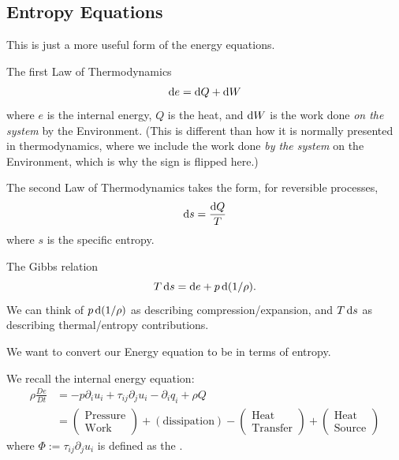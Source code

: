 \subsection{Entropy Equations}

\begin{node}
This is just a more useful form of the energy equations.
\end{node}

\begin{recall}
The first Law of Thermodynamics 
\begin{equation}
\mathrm{d} e = \mathrm{d} Q + \mathrm{d} W
\end{equation}
where $e$ is the internal energy, $Q$ is the heat, and $\mathrm{d} W$ is the
work done \emph{on the system} by the Environment. (This is different
than how it is normally presented in thermodynamics, where we include
the work done \emph{by the system} on the Environment, which is why
the sign is flipped here.)
\end{recall}

\begin{recall}
The second Law of Thermodynamics takes the form, for reversible processes,
\begin{equation}
\mathrm{d} s = \frac{\mathrm{d} Q}{T}
\end{equation}
where $s$ is the specific entropy.
\end{recall}

\begin{recall}
The Gibbs relation
\begin{equation}
T\,\mathrm{d} s = \mathrm{d} e + p\,\mathrm{d}(1/\rho).
\end{equation}
We can think of $p\,\mathrm{d}(1/\rho)$ as describing compression/expansion,
and $T\,\mathrm{d} s$ as describing thermal/entropy contributions.
\end{recall}

\begin{goal}
We want to convert our Energy equation to be in terms of entropy.
\end{goal}

\begin{node}
We recall the internal energy equation:
\begin{align}
\rho\frac{D e}{D t}
&=-p\partial_{i}u_{i} + \tau_{ij}\partial_{j}u_{i} - \partial_{i}q_{i}
+ \rho Q\label{eq:me101a:fall:lec13:eq1}\\
&=\begin{pmatrix}\mbox{Pressure}\\
\mbox{Work}
\end{pmatrix} + (\mbox{dissipation}) - \begin{pmatrix}\mbox{Heat}\\
\mbox{Transfer}
\end{pmatrix} + \begin{pmatrix}\mbox{Heat}\\
\mbox{Source}
\end{pmatrix}\nonumber
\end{align}
where $\Phi:=\tau_{ij}\partial_{j}u_{i}$ is defined as the .
\end{node}

